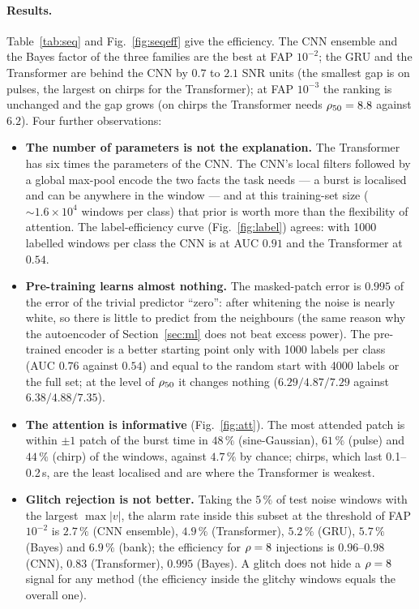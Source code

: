 \paragraph{Results.} Table~\ref{tab:seq} and Fig.~\ref{fig:seqeff} give the efficiency. The CNN ensemble and the Bayes factor of the three families are the best at FAP $10^{-2}$; the GRU and the Transformer are behind the CNN by $0.7$ to $2.1$ SNR units (the smallest gap is on pulses, the largest on chirps for the Transformer); at FAP $10^{-3}$ the ranking is unchanged and the gap grows (on chirps the Transformer needs $\rho_{50}=8.8$ against $6.2$). Four further observations:
\begin{itemize}[nosep]
\item \textbf{The number of parameters is not the explanation.} The Transformer has six times the parameters of the CNN. The CNN's local filters followed by a global max-pool encode the two facts the task needs --- a burst is localised and can be anywhere in the window --- and at this training-set size ($\sim1.6\times10^4$ windows per class) that prior is worth more than the flexibility of attention. The label-efficiency curve (Fig.~\ref{fig:label}) agrees: with 1000 labelled windows per class the CNN is at AUC $0.91$ and the Transformer at $0.54$.
\item \textbf{Pre-training learns almost nothing.} The masked-patch error is $0.995$ of the error of the trivial predictor ``zero'': after whitening the noise is nearly white, so there is little to predict from the neighbours (the same reason why the autoencoder of Section~\ref{sec:ml} does not beat excess power). The pre-trained encoder is a better starting point only with 1000 labels per class (AUC $0.76$ against $0.54$) and equal to the random start with 4000 labels or the full set; at the level of $\rho_{50}$ it changes nothing ($6.29/4.87/7.29$ against $6.38/4.88/7.35$).
\item \textbf{The attention is informative} (Fig.~\ref{fig:att}). The most attended patch is within $\pm1$ patch of the burst time in $48\,\%$ (sine-Gaussian), $61\,\%$ (pulse) and $44\,\%$ (chirp) of the windows, against $4.7\,\%$ by chance; chirps, which last 0.1--0.2\,s, are the least localised and are where the Transformer is weakest.
\item \textbf{Glitch rejection is not better.} Taking the $5\,\%$ of test noise windows with the largest $\max|v|$, the alarm rate inside this subset at the threshold of FAP $10^{-2}$ is $2.7\,\%$ (CNN ensemble), $4.9\,\%$ (Transformer), $5.2\,\%$ (GRU), $5.7\,\%$ (Bayes) and $6.9\,\%$ (bank); the efficiency for $\rho=8$ injections is $0.96$--$0.98$ (CNN), $0.83$ (Transformer), $0.995$ (Bayes). A glitch does not hide a $\rho=8$ signal for any method (the efficiency inside the glitchy windows equals the overall one).
\end{itemize}

